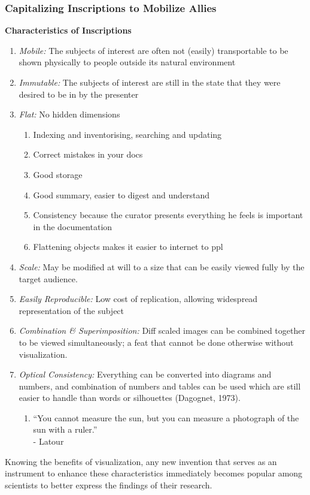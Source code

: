\documentclass[a4paper]{article}
\begin{document}
\subsubsection{Capitalizing Inscriptions to Mobilize Allies}
\noindent\textbf{Characteristics of Inscriptions}
\begin{enumerate}
	\item \textit{Mobile:} The subjects of interest are often not (easily) transportable to be shown physically to people outside its natural environment
	\item \textit{Immutable:} The subjects of interest are still in the state that they were desired to be in by the presenter
	\item \textit{Flat:} No hidden dimensions
	\begin{enumerate}[label=\alph*.]
		\item Indexing and inventorising, searching and updating
		\item Correct mistakes in your docs
		\item Good storage
		\item Good summary, easier to digest and understand
		\item Consistency because the curator presents everything he feels is important in the documentation
		\item Flattening objects makes it easier to internet to ppl
	\end{enumerate}
	\item \textit{Scale:} May be modified at will to a size that can be easily viewed fully by the target audience.
	\item \textit{Easily Reproducible:} Low cost of replication, allowing widespread representation of the subject
	\item \textit{Combination \& Superimposition:} Diff scaled images can be combined together to be viewed simultaneously; a feat that cannot be done otherwise without visualization.
	\item \textit{Optical Consistency:} Everything can be converted into diagrams and numbers, and combination of numbers and tables can be used which are still easier to handle than words or silhouettes (Dagognet, 1973). 
	\begin{enumerate}[label=\alph*.]
		\item ``You cannot measure the sun, but you can measure a photograph of the sun with a ruler.''\\ - Latour
	\end{enumerate}	
\end{enumerate}
\noindent Knowing the benefits of visualization, any new invention that serves as an instrument to enhance these characteristics immediately becomes popular among scientists to better express the findings of their research.
\end{document}
